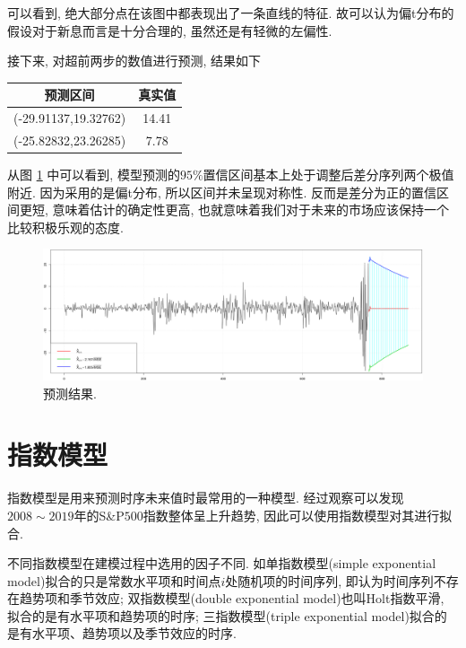 \documentclass[12pt]{article}
\begin{document}
\qquad 可以看到, 绝大部分点在该图中都表现出了一条直线的特征. 故可以认为偏t分布的假设对于新息而言是十分合理的, 虽然还是有轻微的左偏性.

\qquad 接下来, 对超前两步的数值进行预测, 结果如下

\begin{table}[htbp]
    \centering
    \label{tab:my-table5}
    \begin{tabular}{cc}
    \hline
    预测区间                 & 真实值   \\ \hline
    (-29.91137,19.32762) & 14.41 \\
    (-25.82832,23.26285) & 7.78  \\ \hline
    \end{tabular}
\end{table}

\qquad 从图 \ref{fig:f3} 中可以看到, 模型预测的$95\%$置信区间基本上处于调整后差分序列两个极值附近. 因为采用的是偏t分布, 所以区间并未呈现对称性. 反而是差分为正的置信区间更短, 意味着估计的确定性更高, 也就意味着我们对于未来的市场应该保持一个比较积极乐观的态度. 
\begin{figure}[h]
    \centering
    \includegraphics[width=1\textwidth]{f3}
    \caption{预测结果. \label{fig:f3}}
\end{figure}
\section{指数模型}
\qquad 指数模型是用来预测时序未来值时最常用的一种模型. 经过观察可以发现$2008\sim2019$年的S\&P$500$指数整体呈上升趋势, 因此可以使用指数模型对其进行拟合. 

\qquad 不同指数模型在建模过程中选用的因子不同. 如单指数模型(simple exponential model)拟合的只是常数水平项和时间点$i$处随机项的时间序列, 即认为时间序列不存在趋势项和季节效应; 双指数模型(double exponential model)也叫Holt指数平滑, 拟合的是有水平项和趋势项的时序; 三指数模型(triple exponential model)拟合的是有水平项、趋势项以及季节效应的时序. 
\end{document}
